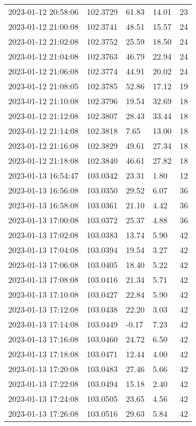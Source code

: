 \documentclass{nature_plusfigure}
\begin{document}
\begin{supplement}
\begin{center}
\begin{longtable}{lllll}
2023-01-12 20:58:06 & 102.3729 & 61.83 & 14.01 & 23 \\ 
2023-01-12 21:00:08 & 102.3741 & 48.51 & 15.57 & 24 \\ 
2023-01-12 21:02:08 & 102.3752 & 25.59 & 18.50 & 24 \\ 
2023-01-12 21:04:08 & 102.3763 & 46.79 & 22.94 & 24 \\ 
2023-01-12 21:06:08 & 102.3774 & 44.91 & 20.02 & 24 \\ 
2023-01-12 21:08:05 & 102.3785 & 52.86 & 17.12 & 19 \\ 
2023-01-12 21:10:08 & 102.3796 & 19.54 & 32.69 & 18 \\ 
2023-01-12 21:12:08 & 102.3807 & 28.43 & 33.44 & 18 \\ 
2023-01-12 21:14:08 & 102.3818 & 7.65 & 13.00 & 18 \\ 
2023-01-12 21:16:08 & 102.3829 & 49.61 & 27.34 & 18 \\ 
2023-01-12 21:18:08 & 102.3840 & 46.61 & 27.82 & 18 \\ 
2023-01-13 16:54:47 & 103.0342 & 23.31 & 1.80 & 12 \\ 
2023-01-13 16:56:08 & 103.0350 & 29.52 & 6.07 & 36 \\ 
2023-01-13 16:58:08 & 103.0361 & 21.10 & 4.42 & 36 \\ 
2023-01-13 17:00:08 & 103.0372 & 25.37 & 4.88 & 36 \\ 
2023-01-13 17:02:08 & 103.0383 & 13.74 & 5.90 & 42 \\ 
2023-01-13 17:04:08 & 103.0394 & 19.54 & 3.27 & 42 \\ 
2023-01-13 17:06:08 & 103.0405 & 18.40 & 5.22 & 42 \\ 
2023-01-13 17:08:08 & 103.0416 & 21.34 & 5.71 & 42 \\ 
2023-01-13 17:10:08 & 103.0427 & 22.84 & 5.90 & 42 \\ 
2023-01-13 17:12:08 & 103.0438 & 22.20 & 3.03 & 42 \\ 
2023-01-13 17:14:08 & 103.0449 & -0.17 & 7.23 & 42 \\ 
2023-01-13 17:16:08 & 103.0460 & 24.72 & 6.50 & 42 \\ 
2023-01-13 17:18:08 & 103.0471 & 12.44 & 4.00 & 42 \\ 
2023-01-13 17:20:08 & 103.0483 & 27.46 & 5.66 & 42 \\ 
2023-01-13 17:22:08 & 103.0494 & 15.18 & 2.40 & 42 \\ 
2023-01-13 17:24:08 & 103.0505 & 23.65 & 4.56 & 42 \\ 
2023-01-13 17:26:08 & 103.0516 & 29.63 & 5.84 & 42 \\ 

\end{longtable}
\end{center}
\end{supplement}
\end{document}
